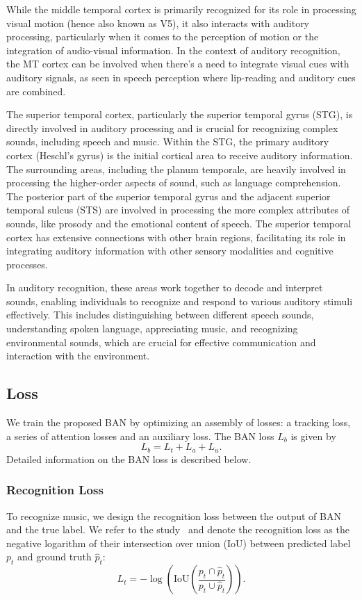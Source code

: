 \documentclass[journal]{IEEEtran}
\begin{document}
While the middle temporal cortex is primarily recognized for its role in processing visual motion (hence also known as V5), it also interacts with auditory processing, particularly when it comes to the perception of motion or the integration of audio-visual information.
In the context of auditory recognition, the MT cortex can be involved when there's a need to integrate visual cues with auditory signals, as seen in speech perception where lip-reading and auditory cues are combined.


The superior temporal cortex, particularly the superior temporal gyrus (STG), is directly involved in auditory processing and is crucial for recognizing complex sounds, including speech and music.
Within the STG, the primary auditory cortex (Heschl's gyrus) is the initial cortical area to receive auditory information. 
The surrounding areas, including the planum temporale, are heavily involved in processing the higher-order aspects of sound, such as language comprehension.
The posterior part of the superior temporal gyrus and the adjacent superior temporal sulcus (STS) are involved in processing the more complex attributes of sounds, like prosody and the emotional content of speech.
The superior temporal cortex has extensive connections with other brain regions, facilitating its role in integrating auditory information with other sensory modalities and cognitive processes.


In auditory recognition, these areas work together to decode and interpret sounds, enabling individuals to recognize and respond to various auditory stimuli effectively. 
This includes distinguishing between different speech sounds, understanding spoken language, appreciating music, and recognizing environmental sounds, which are crucial for effective communication and interaction with the environment.


\subsection{Loss} \label{sec:loss}

We train the proposed BAN by optimizing an assembly of losses: a tracking loss, a series of attention losses and an auxiliary loss. 
The BAN loss $L_{b}$ is given by
\begin{equation}
	L_{b} = L_t + L_a + L_u.
\end{equation}
Detailed information on the BAN loss is described below.


\subsubsection{Recognition Loss}
To recognize music, we design the recognition loss between the output of BAN and the true label. 
We refer to the study~\cite{UnitBox} and denote the recognition loss as the negative logarithm of their intersection over union (IoU) between predicted label $p_t$ and ground truth $\hat{p}_t$:
\begin{equation}
	L_t = -\log(\mbox{IoU} ( \frac{p_t \cap \hat{p}_t}{p_t \cup \hat{p}_t} )).
\end{equation}
\end{document}
